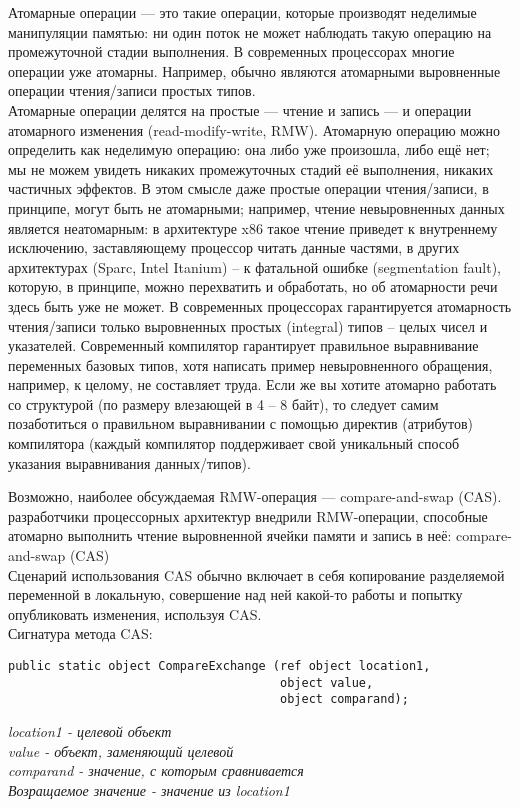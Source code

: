\documentclass{article}
\begin{document}
Атомарные операции — это такие операции, которые производят неделимые манипуляции памятью: ни один поток не может наблюдать такую операцию на промежуточной стадии выполнения. В современных процессорах многие операции уже атомарны. Например, обычно являются атомарными выровненные операции чтения/записи простых типов.\\

Атомарные операции делятся на простые — чтение и запись — и операции атомарного изменения (read-modify-write, RMW). Атомарную операцию можно определить как неделимую операцию: она либо уже произошла, либо ещё нет; мы не можем увидеть никаких промежуточных стадий её выполнения, никаких частичных эффектов. В этом смысле даже простые операции чтения/записи, в принципе, могут быть не атомарными; например, чтение невыровненных данных является неатомарным: в архитектуре x86 такое чтение приведет к внутреннему исключению, заставляющему процессор читать данные частями, в других архитектурах (Sparc, Intel Itanium) – к фатальной ошибке (segmentation fault), которую, в принципе, можно перехватить и обработать, но об атомарности речи здесь быть уже не может. В современных процессорах гарантируется атомарность чтения/записи только выровненных простых (integral) типов – целых чисел и указателей. Современный компилятор гарантирует правильное выравнивание переменных базовых типов, хотя написать пример невыровненного обращения, например, к целому, не составляет труда. Если же вы хотите атомарно работать со структурой (по размеру влезающей в 4 – 8 байт), то следует самим позаботиться о правильном выравнивании с помощью директив (атрибутов) компилятора (каждый компилятор поддерживает свой уникальный способ указания выравнивания данных/типов). 

Возможно, наиболее обсуждаемая RMW-операция — compare-and-swap (CAS). разработчики процессорных архитектур внедрили RMW-операции, способные атомарно выполнить чтение выровненной ячейки памяти и запись в неё: compare-and-swap (CAS)\\

Сценарий использования CAS обычно включает в себя копирование разделяемой переменной в локальную, совершение над ней какой-то работы и попытку опубликовать изменения, используя CAS.\\
Сигнатура метода CAS:
\begin{lstlisting}
public static object CompareExchange (ref object location1, 
                                      object value, 
                                      object comparand);
\end{lstlisting}
\textit{location1 - целевой объект \\ 
value - объект, заменяющий целевой \\ 
comparand - значение, с которым сравнивается \\
Возращаемое значение - значение из location1}
\end{document}
